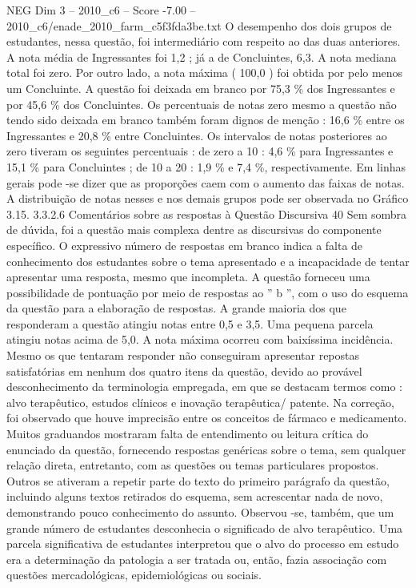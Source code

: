 \begin{textsample}{NEG Dim 3 – 2010\_c6 – Score -7.00 – 2010\_c6/enade\_2010\_farm\_c5f3fda3be.txt}
O desempenho dos dois grupos de estudantes, nessa questão, foi intermediário com respeito ao das duas anteriores.
A nota média de Ingressantes foi 1,2 ; já a de Concluintes, 6,3.
A nota mediana total foi zero.
Por outro lado, a nota máxima ( 100,0 ) foi obtida por pelo menos um Concluinte.
A questão foi deixada em branco por 75,3 \% dos Ingressantes e por 45,6 \% dos Concluintes.
Os percentuais de notas zero mesmo a questão não tendo sido deixada em branco também foram dignos de menção : 16,6 \% entre os Ingressantes e 20,8 \% entre Concluintes.
Os intervalos de notas posteriores ao zero tiveram os seguintes percentuais : de zero a 10 : 4,6 \% para Ingressantes e 15,1 \% para Concluintes ; de 10 a 20 : 1,9 \% e 7,4 \%, respectivamente.
Em linhas gerais pode -se dizer que as proporções caem com o aumento das faixas de notas.
A distribuição de notas nesses e nos demais grupos pode ser observada no Gráfico 3.15. 3.3.2.6 Comentários sobre as respostas à Questão Discursiva 40 Sem sombra de dúvida, foi a questão mais complexa dentre as discursivas do componente específico.
O expressivo número de respostas em branco indica a falta de conhecimento dos estudantes sobre o tema apresentado e a incapacidade de tentar apresentar uma resposta, mesmo que incompleta.
A questão forneceu uma possibilidade de pontuação por meio de respostas ao ” b ”, com o uso do esquema da questão para a elaboração de respostas.
A grande maioria dos que responderam a questão atingiu notas entre 0,5 e 3,5.
Uma pequena parcela atingiu notas acima de 5,0.
A nota máxima ocorreu com baixíssima incidência.
Mesmo os que tentaram responder não conseguiram apresentar repostas satisfatórias em nenhum dos quatro itens da questão, devido ao provável desconhecimento da terminologia empregada, em que se destacam termos como : alvo terapêutico, estudos clínicos e inovação terapêutica/ patente.
Na correção, foi observado que houve imprecisão entre os conceitos de fármaco e medicamento.
Muitos graduandos mostraram falta de entendimento ou leitura crítica do enunciado da questão, fornecendo respostas genéricas sobre o tema, sem qualquer relação direta, entretanto, com as questões ou temas particulares propostos.
Outros se ativeram a repetir parte do texto do primeiro parágrafo da questão, incluindo alguns textos retirados do esquema, sem acrescentar nada de novo, demonstrando pouco conhecimento do assunto.
Observou -se, também, que um grande número de estudantes desconhecia o significado de alvo terapêutico.
Uma parcela significativa de estudantes interpretou que o alvo do processo em estudo era a determinação da patologia a ser tratada ou, então, fazia associação com questões mercadológicas, epidemiológicas ou sociais.

\end{textsample}
